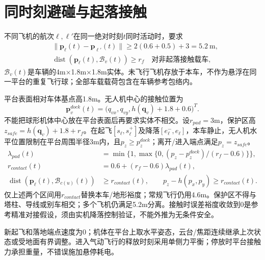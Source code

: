 \section{同时刻避碰与起落接触}
\noindent 不同飞机的航次$\ell,\ell'$在同一绝对时刻$t$同时活动时，要求
\begin{align}
 &\|\mathbf p_\ell(t)-\mathbf p_{\ell'}(t)\|\ge
       2(0.6+0.5)+3=5.2\ \mathrm m,\label{eng:eq:collision}\\
 &\operatorname{dist}(\mathbf p_\ell(t),\mathcal B_v(t))\ge r_f
       \quad\text{对非起落接触载车},\label{eng:eq:airvehicle}
\end{align}
\noindent $\mathcal B_v(t)$是车辆的4m×1.8m×1.8m实体。未飞行飞机存放于本车，不作为悬浮在同一平台的重复飞行球；全部车载载荷包含在车辆参考包络内。

\noindent 平台表面相对车体基点高1.8m。无人机中心的接触位置为
\begin{equation}
 \mathbf p^{dock}_v(t)=\big(q_{vx},q_{vy},h(\mathbf q_v)+1.8+0.6\big)^T.
 \label{eng:eq:dock}
\end{equation}
\noindent 不能把球形机体中心放在平台表面后再要求实体不相交。设$r_{pad}=3$m，保护区高$z_{safe}=h(\mathbf q_v)+1.8+r_f$。在起飞$[s_\ell,s_\ell^+]$及降落$[e_\ell^-,e_\ell]$，本车静止，无人机水平位置限制在平台周围半径3m内，且$p_z\ge p_z^{dock}$；离开/进入端点满足$p_z=z_{safe}$。
\begin{align}
 \lambda_{pad}(t)&=\min\{1,\max\{0,(p_z-p_z^{dock})/(r_f-0.6)\}\},\\
 r_{contact}(t)&=0.6+(r_f-0.6)\lambda_{pad}(t),\\
 \operatorname{dist}(\mathbf p_\ell(t),\mathcal B_{c(u)}(t))&\ge r_{contact}(t),\qquad
 p_z-h(p_x,p_y)\ge r_{contact}(t).
 \label{eng:eq:padcontact}
\end{align}
\noindent 仅上述两个区间用$r_{contact}$替换本车/地形裕度；常规飞行仍用4.6m。保护区不得与塔柱、导线或别车相交；多个飞机仍满足5.2m分离。接触时误差裕度收敛到0是参考精准对接假设，须由实机降落控制验证，不能外推为无条件安全。

\noindent 新起飞和落地端点速度为0；机体在平台上取水平姿态，云台/焦距连续继承上次状态或受地面有界调整。进入气动飞行的释放时刻采用单侧力平衡；停放时平台接触力承担重量，不错误施加悬停耗电。
\clearpage

